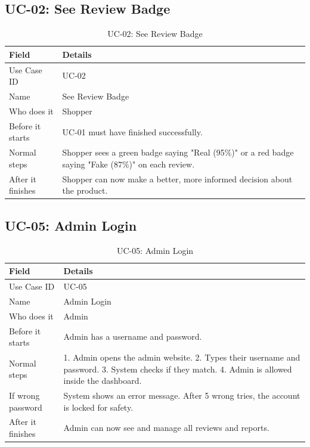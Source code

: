 \documentclass[10pt, a4paper]{report}
\begin{document}
\subsection{UC-02: See Review Badge}

\begin{table}[H]
\centering
\caption{UC-02: See Review Badge}
\begin{tabularx}{\textwidth}{lX}
\toprule
\textbf{Field} & \textbf{Details} \\
\midrule
Use Case ID & UC-02 \\
Name & See Review Badge \\
Who does it & Shopper \\
Before it starts & UC-01 must have finished successfully. \\
Normal steps & Shopper sees a green badge saying "Real (95\%)" or a red badge saying "Fake (87\%)" on each review. \\
After it finishes & Shopper can now make a better, more informed decision about the product. \\
\bottomrule
\end{tabularx}
\end{table}

\subsection{UC-05: Admin Login}

\begin{table}[H]
\centering
\caption{UC-05: Admin Login}
\begin{tabularx}{\textwidth}{lX}
\toprule
\textbf{Field} & \textbf{Details} \\
\midrule
Use Case ID & UC-05 \\
Name & Admin Login \\
Who does it & Admin \\
Before it starts & Admin has a username and password. \\
Normal steps & 1. Admin opens the admin website. 2. Types their username and password. 3. System checks if they match. 4. Admin is allowed inside the dashboard. \\
If wrong password & System shows an error message. After 5 wrong tries, the account is locked for safety. \\
After it finishes & Admin can now see and manage all reviews and reports. \\
\bottomrule
\end{tabularx}
\end{table}
\end{document}
